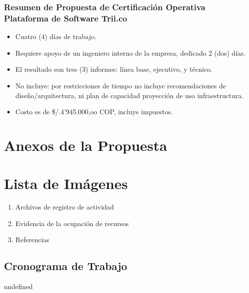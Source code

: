 \documentclass[
  paper=a4,
  ,captions=tableheading
]{scrartcl}
\providecommand{\tightlist}{%
  \setlength{\itemsep}{0pt}\setlength{\parskip}{0pt}}
\renewenvironment{quote}{\begin{customblockquote}\list{}{\rightmargin=0em\leftmargin=0em}%
\item\relax\color{blockquote-text}\ignorespaces}{\unskip\unskip\endlist\end{customblockquote}}
\begin{document}
\subsubsection{Resumen de Propuesta de Certificación Operativa
Plataforma de Software
Trii.co}\label{sec:resumen-de-propuesta-de-certificaciuxf3n-operativa-plataforma-de-software-trii.co}

\begin{itemize}
\tightlist
\item
  Cuatro (4) días de trabajo.
\item
  Requiere apoyo de un ingeniero interno de la empresa, dedicado 2 (dos)
  días.
\item
  El resultado son tres (3) informes: línea base, ejecutivo, y técnico.
\item
  No incluye: por restricciones de tiempo no incluye recomendaciones de
  diseño/arquitectura, ni plan de capacidad proyección de uso
  infraestructura.
\item
  Costo es de \$/.4'945.000,oo COP, incluye impuestos.
\end{itemize}

\newpage

\section{Anexos de la Propuesta}\label{sec:anexos-de-la-propuesta}

\newpage

\section{Lista de Imágenes}\label{sec:lista-de-imuxe1genes}

\begin{enumerate}
\def\labelenumi{\arabic{enumi}.}
\tightlist
\item
  Archivos de registro de actividad
\item
  Evidencia de la ocupación de recursos
\item
  Referencias
\end{enumerate}

\subsection{Cronograma de Trabajo}\label{sec:cronograma-de-trabajo}

\begin{quote}
undefined
\end{quote}
\end{document}
